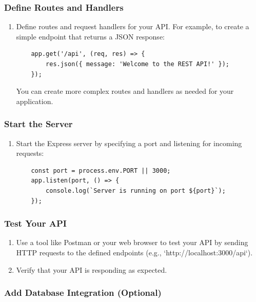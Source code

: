 \documentclass[11pt]{article}
\begin{document}
\subsubsection{Define Routes and Handlers}

\begin{enumerate}
    \item Define routes and request handlers for your API. For example, to create a simple endpoint that returns a JSON response:
          \begin{verbatim}
    app.get('/api', (req, res) => {
        res.json({ message: 'Welcome to the REST API!' });
    });
    \end{verbatim}
          You can create more complex routes and handlers as needed for your application.
\end{enumerate}

\subsubsection{Start the Server}

\begin{enumerate}
    \item Start the Express server by specifying a port and listening for incoming requests:
          \begin{verbatim}
    const port = process.env.PORT || 3000;
    app.listen(port, () => {
        console.log(`Server is running on port ${port}`);
    });
    \end{verbatim}
\end{enumerate}

\subsubsection{Test Your API}

\begin{enumerate}
    \item Use a tool like Postman or your web browser to test your API by sending HTTP requests to the defined endpoints (e.g., `http://localhost:3000/api`).
    \item Verify that your API is responding as expected.
\end{enumerate}

\subsubsection{Add Database Integration (Optional)}
\end{document}
